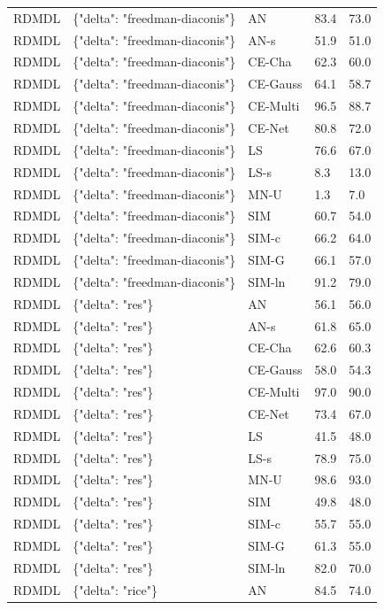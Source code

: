 \begin{tabular}{lllll}
RDMDL & \{"delta": "freedman-diaconis"\} & AN & 83.4 & 73.0 \\
RDMDL & \{"delta": "freedman-diaconis"\} & AN-s & 51.9 & 51.0 \\
RDMDL & \{"delta": "freedman-diaconis"\} & CE-Cha & 62.3 & 60.0 \\
RDMDL & \{"delta": "freedman-diaconis"\} & CE-Gauss & 64.1 & 58.7 \\
RDMDL & \{"delta": "freedman-diaconis"\} & CE-Multi & 96.5 & 88.7 \\
RDMDL & \{"delta": "freedman-diaconis"\} & CE-Net & 80.8 & 72.0 \\
RDMDL & \{"delta": "freedman-diaconis"\} & LS & 76.6 & 67.0 \\
RDMDL & \{"delta": "freedman-diaconis"\} & LS-s & 8.3 & 13.0 \\
RDMDL & \{"delta": "freedman-diaconis"\} & MN-U & 1.3 & 7.0 \\
RDMDL & \{"delta": "freedman-diaconis"\} & SIM & 60.7 & 54.0 \\
RDMDL & \{"delta": "freedman-diaconis"\} & SIM-c & 66.2 & 64.0 \\
RDMDL & \{"delta": "freedman-diaconis"\} & SIM-G & 66.1 & 57.0 \\
RDMDL & \{"delta": "freedman-diaconis"\} & SIM-ln & 91.2 & 79.0 \\
RDMDL & \{"delta": "res"\} & AN & 56.1 & 56.0 \\
RDMDL & \{"delta": "res"\} & AN-s & 61.8 & 65.0 \\
RDMDL & \{"delta": "res"\} & CE-Cha & 62.6 & 60.3 \\
RDMDL & \{"delta": "res"\} & CE-Gauss & 58.0 & 54.3 \\
RDMDL & \{"delta": "res"\} & CE-Multi & 97.0 & 90.0 \\
RDMDL & \{"delta": "res"\} & CE-Net & 73.4 & 67.0 \\
RDMDL & \{"delta": "res"\} & LS & 41.5 & 48.0 \\
RDMDL & \{"delta": "res"\} & LS-s & 78.9 & 75.0 \\
RDMDL & \{"delta": "res"\} & MN-U & 98.6 & 93.0 \\
RDMDL & \{"delta": "res"\} & SIM & 49.8 & 48.0 \\
RDMDL & \{"delta": "res"\} & SIM-c & 55.7 & 55.0 \\
RDMDL & \{"delta": "res"\} & SIM-G & 61.3 & 55.0 \\
RDMDL & \{"delta": "res"\} & SIM-ln & 82.0 & 70.0 \\
RDMDL & \{"delta": "rice"\} & AN & 84.5 & 74.0 \\

\end{tabular}
